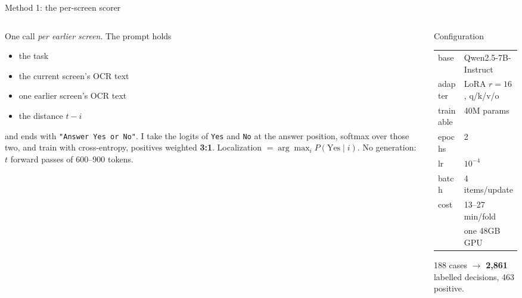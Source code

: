 \documentclass[aspectratio=169,10pt]{beamer}
\newcommand{\gr}[1]{{\color{ncgray}#1}}
\begin{document}
\begin{frame}{Method 1: the per-screen scorer}
\vspace{0.25cm}
\begin{columns}[T]
\begin{column}{0.53\textwidth}
One call \emph{per earlier screen}. The prompt holds
\begin{itemize}\setlength\itemsep{0.2em}
\item the task
\item the current screen's OCR text
\item \alert{one} earlier screen's OCR text
\item the distance $t-i$
\end{itemize}
and ends with \texttt{"Answer Yes or No"}.
\vspace{0.5em}
I take the logits of \texttt{Yes} and \texttt{No} at the answer position, softmax over those two, and train with cross-entropy, positives weighted \textbf{3:1}.
\vspace{0.5em}
Localization $=\arg\max_i P(\text{Yes}\mid i)$. \gr{No generation: $t$ forward passes of 600--900 tokens.}
\end{column}
\begin{column}{0.44\textwidth}
\begin{block}{Configuration}
\begin{tabular}{ll}
base & Qwen2.5-7B-Instruct\\
adapter & LoRA $r{=}16$, q/k/v/o\\
trainable & 40M params\\
epochs & 2\\
lr & $10^{-4}$\\
batch & 4 items/update\\
cost & 13--27 min/fold\\
& \gr{one 48GB GPU}\\
\end{tabular}
\end{block}
\gr{188 cases $\rightarrow$ \textbf{2,861} labelled decisions, 463 positive.}
\end{column}
\end{columns}
\end{frame}
\end{document}

